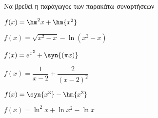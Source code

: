 Να βρεθεί η παράγωγος των παρακάτω συναρτήσεων
\begin{alist}
\item $ f(x)=\hm^2{x}+\hm{x^2} $
\item $ f(x)=\sqrt{x^2-x}-\ln{(x^2-x)} $
\item $ f(x)=e^{x^2}+\syn{(\pi x)} $
\item $ f(x)=\dfrac{1}{x-2}+\dfrac{2}{(x-2)^2} $
\item $ f(x)=\syn{x^3}-\hm{x^3} $
\item $ f(x)=\ln^2{x}+\ln{x^2}-\ln{x} $
\end{alist}
